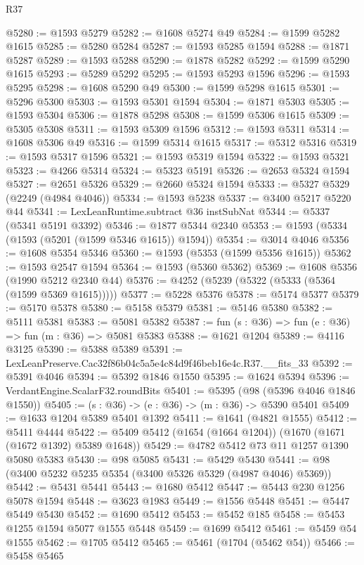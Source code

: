 \begin{lexlean}{R37}
\begin{coremodule}
@5280 := @1593 @5279
@5282 := @1608 @5274 @49
@5284 := @1599 @5282 @1615
@5285 := @5280 @5284
@5287 := @1593 @5285 @1594
@5288 := @1871 @5287
@5289 := @1593 @5288
@5290 := @1878 @5282
@5292 := @1599 @5290 @1615
@5293 := @5289 @5292
@5295 := @1593 @5293 @1596
@5296 := @1593 @5295
@5298 := @1608 @5290 @49
@5300 := @1599 @5298 @1615
@5301 := @5296 @5300
@5303 := @1593 @5301 @1594
@5304 := @1871 @5303
@5305 := @1593 @5304
@5306 := @1878 @5298
@5308 := @1599 @5306 @1615
@5309 := @5305 @5308
@5311 := @1593 @5309 @1596
@5312 := @1593 @5311
@5314 := @1608 @5306 @49
@5316 := @1599 @5314 @1615
@5317 := @5312 @5316
@5319 := @1593 @5317 @1596
@5321 := @1593 @5319 @1594
@5322 := @1593 @5321
@5323 := @4266 @5314
@5324 := @5323 @5191
@5326 := @2653 @5324 @1594
@5327 := @2651 @5326
@5329 := @2660 @5324 @1594
@5333 := @5327 @5329 (@2249 (@4984 @4046))
@5334 := @1593 @5238
@5337 := @3400 @5217 @5220 @44
@5341 := LexLeanRuntime.subtract @36 instSubNat
@5344 := @5337 (@5341 @5191 @3392)
@5346 := @1877 @5344 @2340
@5353 := @1593 (@5334 (@1593 (@5201 (@1599 @5346 @1615)) @1594))
@5354 := @3014 @4046
@5356 := @1608 @5354 @5346
@5360 := @1593 (@5353 (@1599 @5356 @1615))
@5362 := @1593 @2547 @1594
@5364 := @1593 (@5360 @5362)
@5369 := @1608 @5356 (@1990 @5212 @2340 @44)
@5376 := @4252 (@5239 (@5322 (@5333 (@5364 (@1599 @5369 @1615)))))
@5377 := @5228 @5376
@5378 := @5174 @5377
@5379 := @5170 @5378
@5380 := @5158 @5379
@5381 := @5146 @5380
@5382 := @5111 @5381
@5383 := @5081 @5382
@5387 := fun (s : @36) => fun (e : @36) => fun (m : @36) => @5081 @5383
@5388 := @1621 @1204
@5389 := @4116 @3125
@5390 := @5388 @5389
@5391 := LexLeanPreserve.Cac32f86b04c5a5e4c84d9f46beb16e4c.R37.__fits_33
@5392 := @5391 @4046
@5394 := @5392 @1846 @1550
@5395 := @1624 @5394
@5396 := VerdantEngine.ScalarF32.roundBits
@5401 := @5395 (@98 (@5396 @4046 @1846 @1550))
@5405 := (s : @36) -> (e : @36) -> (m : @36) -> @5390 @5401
@5409 := @1633 @1204 @5389 @5401 @1392
@5411 := @1641 (@4821 @1555)
@5412 := @5411 @4444
@5422 := @5409 @5412 (@1654 (@1664 @1204)) (@1670 (@1671 (@1672 @1392) @5389 @1648))
@5429 := @4782 @5412 @73 @11 @1257 @1390 @5080 @5383
@5430 := @98 @5085
@5431 := @5429 @5430
@5441 := @98 (@3400 @5232 @5235 @5354 (@3400 @5326 @5329 (@4987 @4046) @5369))
@5442 := @5431 @5441
@5443 := @1680 @5412
@5447 := @5443 @230 @1256 @5078 @1594
@5448 := @3623 @1983
@5449 := @1556 @5448
@5451 := @5447 @5449 @5430
@5452 := @1690 @5412
@5453 := @5452 @185
@5458 := @5453 @1255 @1594 @5077 @1555 @5448
@5459 := @1699 @5412
@5461 := @5459 @54 @1555
@5462 := @1705 @5412
@5465 := @5461 (@1704 (@5462 @54))
@5466 := @5458 @5465

\end{coremodule}
\end{lexlean}
